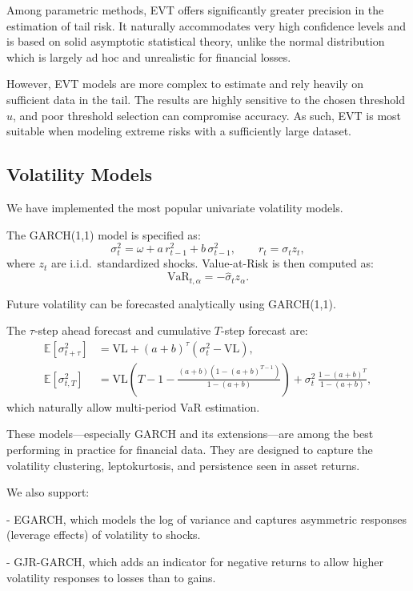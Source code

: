 \documentclass[12pt]{article}
\begin{document}
Among parametric methods, EVT offers significantly greater precision in the estimation of tail risk. It naturally accommodates very high confidence levels and is based on solid asymptotic statistical theory, unlike the normal distribution which is largely ad hoc and unrealistic for financial losses.

However, EVT models are more complex to estimate and rely heavily on sufficient data in the tail. The results are highly sensitive to the chosen threshold $u$, and poor threshold selection can compromise accuracy. As such, EVT is most suitable when modeling extreme risks with a sufficiently large dataset.


\subsection{Volatility Models}

We have implemented the most popular univariate volatility models.

The GARCH(1,1) model is specified as:
\[
  \sigma_t^2 = \omega + a\, r_{t-1}^2 + b\, \sigma_{t-1}^2, \qquad r_t = \sigma_t z_t,
\]
where \( z_t \) are i.i.d.\ standardized shocks. Value-at-Risk is then computed as:
\[
  \text{VaR}_{t,\alpha} = -\hat{\sigma}_t z_\alpha.
\]

Future volatility can be forecasted analytically using GARCH(1,1).

The \( \tau \)-step ahead forecast and cumulative \( T \)-step forecast are:
\begin{align*}
  \mathbb{E}[\sigma_{t+\tau}^2] &= \mathrm{VL} + (a + b)^\tau(\sigma_t^2 - \mathrm{VL}),  \\  
  \mathbb{E}[\sigma_{t,T}^2] &= \mathrm{VL}\left(T - 1 - \frac{(a + b)(1 - (a + b)^{T - 1})}{1 - (a + b)}\right)
    + \sigma_t^2\, \frac{1 - (a + b)^T}{1 - (a + b)},
\end{align*}
which naturally allow multi-period VaR estimation.

These models—especially GARCH and its extensions—are among the best performing in practice for financial data. They are designed to capture the volatility clustering, leptokurtosis, and persistence seen in asset returns.

We also support:

- EGARCH, which models the log of variance and captures asymmetric responses (leverage effects) of volatility to shocks.

- GJR-GARCH, which adds an indicator for negative returns to allow higher volatility responses to losses than to gains.
\end{document}
